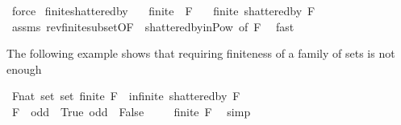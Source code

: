 \begin{isabellebody}
\ force%
\endisatagproof
{\isafoldproof}%
%
\isadelimproof
\isanewline
%
\endisadelimproof
\isanewline
{}\isamarkupfalse%
\ finite{\isacharunderscore}{\kern0pt}shattered{\isacharunderscore}{\kern0pt}by{\isacharcolon}{\kern0pt}\isanewline
\ \ \ {\isachardoublequoteopen}finite\ {\isacharparenleft}{\kern0pt}{\isasymUnion}\ F{\isacharparenright}{\kern0pt}{\isachardoublequoteclose}\isanewline
\ \ \ {\isachardoublequoteopen}finite\ {\isacharparenleft}{\kern0pt}shattered{\isacharunderscore}{\kern0pt}by\ F{\isacharparenright}{\kern0pt}{\isachardoublequoteclose}\isanewline
%
\isadelimproof
\ \ %
\endisadelimproof
%
\isatagproof
{}\isamarkupfalse%
\ assms\ rev{\isacharunderscore}{\kern0pt}finite{\isacharunderscore}{\kern0pt}subset{\isacharbrackleft}{\kern0pt}OF\ {\isacharunderscore}{\kern0pt}\ shattered{\isacharunderscore}{\kern0pt}by{\isacharunderscore}{\kern0pt}in{\isacharunderscore}{\kern0pt}Pow{\isacharcomma}{\kern0pt}\ of\ F{\isacharbrackright}{\kern0pt}\ \isamarkupfalse%
\ fast%
\endisatagproof
{\isafoldproof}%
%
\isadelimproof
%
\endisadelimproof
%
\begin{isamarkuptext}%
The following example shows that requiring finiteness of a family of sets is not enough%
\end{isamarkuptext}\isamarkuptrue%
\isamarkupfalse%
\ {\isachardoublequoteopen}{\isasymexists}F{\isacharcolon}{\kern0pt}{\isacharcolon}{\kern0pt}nat\ set\ set{\isachardot}{\kern0pt}\ finite\ F\ {\isasymand}\ infinite\ {\isacharparenleft}{\kern0pt}shattered{\isacharunderscore}{\kern0pt}by\ F{\isacharparenright}{\kern0pt}{\isachardoublequoteclose}\isanewline
%
\isadelimproof
%
\endisadelimproof
%
\isatagproof
{}\isamarkupfalse%
\ {\isacharminus}{\kern0pt}\ \ \ \ \ \ \ \ \ \ \ \isanewline
\ \ \isamarkupfalse%
\ {\isacharquery}{\kern0pt}F\ {\isacharequal}{\kern0pt}\ {\isachardoublequoteopen}{\isacharbraceleft}{\kern0pt}odd\ {\isacharminus}{\kern0pt}{\isacharbackquote}{\kern0pt}\ {\isacharbraceleft}{\kern0pt}True{\isacharbraceright}{\kern0pt}{\isacharcomma}{\kern0pt}\ odd\ {\isacharminus}{\kern0pt}{\isacharbackquote}{\kern0pt}\ {\isacharbraceleft}{\kern0pt}False{\isacharbraceright}{\kern0pt}{\isacharbraceright}{\kern0pt}{\isachardoublequoteclose}\isanewline
\ \ \isamarkupfalse%
\ {}{\isacharcolon}{\kern0pt}\ {\isachardoublequoteopen}finite\ {\isacharquery}{\kern0pt}F{\isachardoublequoteclose}\ \isamarkupfalse%
\ simp\isanewline
\isanewline
\ \ \isamarkupfalse%

\end{isabellebody}
